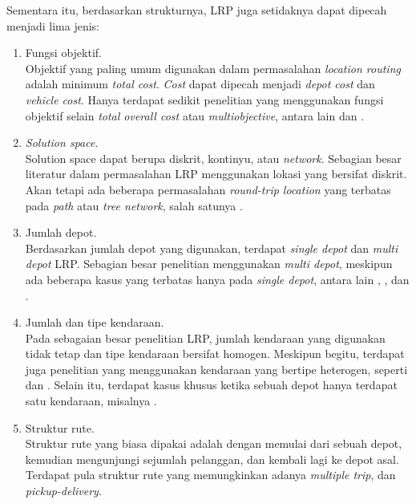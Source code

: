 Sementara itu, berdasarkan strukturnya, LRP juga setidaknya dapat dipecah menjadi lima jenis:
\begin{enumerate}
\item Fungsi objektif. \\
	Objektif yang paling umum digunakan dalam permasalahan \textit{location routing} adalah minimum \textit{total cost}. \textit{Cost} dapat dipecah menjadi \textit{depot cost} dan \textit{vehicle cost}. Hanya terdapat sedikit penelitian yang menggunakan fungsi objektif selain \textit{total overall cost} atau \textit{multiobjective}, antara lain \citep{averbakh_technical_1994} dan \citep{averbakh_probabilistic_1995}.
\item \textit{Solution space}. \\
	Solution space dapat berupa diskrit, kontinyu, atau \textit{network}. Sebagian besar literatur dalam permasalahan LRP menggunakan lokasi yang bersifat diskrit. Akan tetapi ada beberapa permasalahan \textit{round-trip location} yang terbatas pada \textit{path} atau \textit{tree network}, salah satunya \citep{simchi-levi_capacitated_1991}.
\item  Jumlah depot. \\
	Berdasarkan jumlah depot yang digunakan, terdapat \textit{single depot} dan \textit{multi depot} LRP. Sebagian besar penelitian menggunakan \textit{multi depot}, meskipun ada beberapa kasus yang terbatas hanya pada \textit{single depot}, antara lain \citep{laporte_exact_1981}, \citep{averbakh_technical_1994}, dan \citep{simchi-levi_capacitated_1991}. 
\item Jumlah dan tipe kendaraan. \\
	Pada sebagaian besar penelitian LRP, jumlah kendaraan yang digunakan tidak tetap dan tipe kendaraan bersifat homogen. Meskipun begitu, terdapat juga penelitian yang menggunakan kendaraan yang bertipe heterogen, seperti \citep{bookbinder_vehicle_1988} dan \citep{salhi_intergrated_1996}. Selain itu, terdapat kasus khusus ketika sebuah depot hanya terdapat satu kendaraan, misalnya \citep{branco_hamiltonian_1990}.
\item Struktur rute. \\
	Struktur rute yang biasa dipakai adalah dengan memulai dari sebuah depot, kemudian mengunjungi sejumlah pelanggan, dan kembali lagi ke depot asal. Terdapat pula struktur rute yang memungkinkan adanya \textit{multiple trip}, dan \textit{pickup-delivery}.
\end{enumerate}


